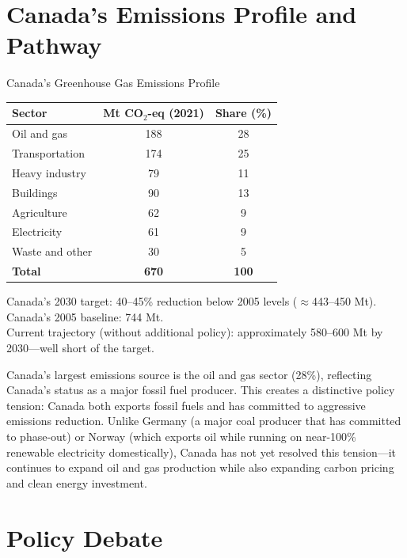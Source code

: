 \section{Canada's Emissions Profile and Pathway}

\begin{databox}{Canada's Greenhouse Gas Emissions Profile}
\begin{center}
\begin{tabular}{lcc}
\toprule
\textbf{Sector} & \textbf{Mt CO$_2$-eq (2021)} & \textbf{Share (\%)} \\
\midrule
Oil and gas & 188 & 28 \\
Transportation & 174 & 25 \\
Heavy industry & 79 & 11 \\
Buildings & 90 & 13 \\
Agriculture & 62 & 9 \\
Electricity & 61 & 9 \\
Waste and other & 30 & 5 \\
\midrule
\textbf{Total} & \textbf{670} & \textbf{100} \\
\bottomrule
\end{tabular}
\end{center}

Canada's 2030 target: 40--45\% reduction below 2005 levels ($\approx$443--450 Mt).\\
Canada's 2005 baseline: 744 Mt.\\
Current trajectory (without additional policy): approximately 580--600 Mt by 2030---well short of the target.
\end{databox}

Canada's largest emissions source is the oil and gas sector (28\%), reflecting Canada's status as a major fossil fuel producer. This creates a distinctive policy tension: Canada both exports fossil fuels and has committed to aggressive emissions reduction. Unlike Germany (a major coal producer that has committed to phase-out) or Norway (which exports oil while running on near-100\% renewable electricity domestically), Canada has not yet resolved this tension---it continues to expand oil and gas production while also expanding carbon pricing and clean energy investment.

\section{Policy Debate}

